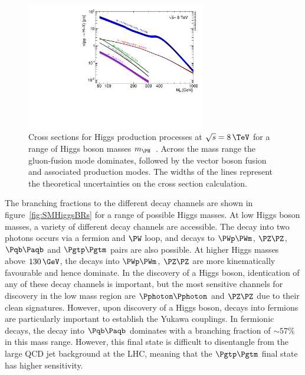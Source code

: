 \begin{figure}[htbp]
   \includegraphics[width=0.7\textwidth]{plots/theory/Higgs_XS_8TeV_lx.pdf}
\caption[Cross sections for Higgs production processes at $\sqrt{s}=8\,\TeV$ for
a range of Higgs boson masses.]{Cross sections for Higgs production processes at
$\sqrt{s}=8\,\TeV$ for a range of Higgs boson masses $m_{\PH}$~\cite{Heinemeyer:2013tqa}. Across the
mass range the gluon-fusion mode dominates, followed by the vector boson fusion
and associated production modes. The widths of the lines represent the
theoretical uncertainties on the cross section calculation.}
\label{fig:SMHiggsXS}
\end{figure}

The branching fractions to the different decay channels are shown in
figure~\ref{fig:SMHiggsBRs} for a range of possible Higgs masses. At low Higgs
boson masses, a variety of different decay channels are accessible. The decay
into two photons occurs via a fermion and $\PW$ loop, and decays to $\PWp\PWm$, $\PZ\PZ$,
$\Pqb\Paqb$ and $\Pgtp\Pgtm$ pairs are also possible. At higher Higgs masses
above $130\,\GeV$, the decays into $\PWp\PWm$, $\PZ\PZ$ are more kinematically
favourable and hence dominate. In the discovery of a Higgs boson, identication of
any of these decay channels is important, but the most sensitive channels for
discovery in the low mass region are $\Pphoton\Pphoton$ and $\PZ\PZ$ due to
their clean signatures. However, upon discovery of a Higgs boson, decays into 
fermions are particularly important
to establish the Yukawa couplings. In fermionic decays, the decay into
$\Pqb\Paqb$ dominates with a branching fraction of $\sim 57\%$ in this mass
range. However, this final state is difficult to disentangle from the large QCD
jet background at the LHC, meaning that the $\Pgtp\Pgtm$ final state has higher sensitivity.


